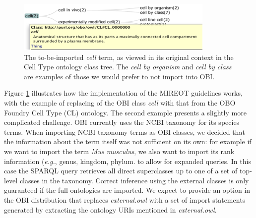 \documentclass{elsart}       %
\begin{document}


\begin{figure}[t]
\centering \includegraphics*[width=1\columnwidth]{cell}
\caption{The to-be-imported \emph{cell} term, as viewed in its original context in the Cell Type ontology class tree. The \emph{cell by organism} and \emph{cell by class} are examples of those we would prefer to not import into OBI.}
\label{fig:cell}
\end{figure}


Figure \ref{fig:cell} illustrates how the implementation of the MIREOT guidelines works, with the example of  replacing of the OBI class \emph{cell} with that from the OBO Foundry Cell Type (CL) ontology\cite{cell}.
The second example presents a slightly more complicated challenge. %
OBI currently uses the NCBI taxonomy for its species terms.
When importing NCBI taxonomy terms as OBI classes, we decided that the information about the term itself was not sufficient on its own: for example if we want to import the term \emph{Mus musculus}, we also want to import its rank information (\emph{e.g.}, genus, kingdom, phylum. to allow for expanded queries.
In this case the SPARQL query retrieves all direct superclasses up to one of a set of top-level classes in the taxonomy. 
Correct inference using the external classes is only guaranteed if the full ontologies are imported.
We expect to provide an option in the OBI distribution that replaces \textit{external.owl} with a set of import statements generated by extracting the ontology URIs mentioned in \emph{external.owl}. 
\end{document}
